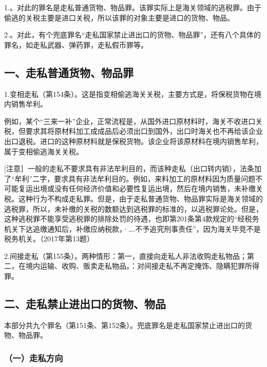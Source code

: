 1.。对此的罪名是走私普通货物、物品罪。该罪实际上是海关领域的逃税罪。由于偷逃的关税主要是进口关税，所以该罪的对象主要是进口的货物、物品。

2.。对此，有个兜底罪名“走私国家禁止进出口的货物、物品罪”，还有八个具体的罪名，如走私武器、弹药罪，走私假币罪等。


\subsection*{一、走私普通货物、物品罪}

1.变相走私（第154条）。这是指变相偷逃海关关税，主要方式是，将保税货物在境内销售牟利。

例如，某个“三来一补”企业，正常流程是，从国外进口原材料时，海关不收进口关税，但要求其将原材料加工成成品后必须出口到国外，出口时海关也不再给该企业出口退税。进口的这种原材料就是保税货物。该企业将该原材料在境内销售牟利，属于变相偷逃海关关税。

[注意］一般的走私不要求具有非法牟利目的，而该种走私（出口转内销），法条加了“牟利”二字，要求具有非法牟利目的。例如，来料加工的原材料因为质量问题不可能复运出境或没有任何经济价值和必要性复运出境，然后在境内销售，未补缴关税。这种行为不构成走私罪。但是，由于走私普通货物、物品罪实际是海关领域的逃税罪，所以，未补缴的关税的数额达到逃税罪的标准的，以逃税罪论处。但是，这种逃税罪不能享受逃税罪的排除处罚的待遇，也即第201条第4款规定的“经税务机关下达追缴通知后，补缴应纳税款，·….不予追究刑事责任”，因为海关毕竞不是税务机关。（2017年第13题）

2.间接走私（第155条）。两种情形：第一，直接向走私人非法收购走私物品；第二，在境内运输、收购、贩卖走私物品。：对间接走私不再定掩饰、隐瞒犯罪所得罪。

\subsection*{二、走私禁止进出口的货物、物品}

本部分共九个罪名（第151条、第152条）。兜底罪名是走私国家禁止进出口的货物、物品罪。

\subsubsection*{（一）走私方向}

